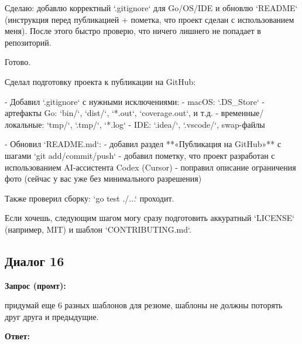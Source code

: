 \documentclass[a4paper, 14pt]{extarticle} %
\begin{document}
\begin{AnswerBlock}

Сделаю: добавлю корректный `.gitignore` для Go/OS/IDE и обновлю `README` (инструкция перед публикацией + пометка, что проект сделан с использованием меня). После этого быстро проверю, что ничего лишнего не попадает в репозиторий.

Готово.

Сделал подготовку проекта к публикации на GitHub:

- Добавил `.gitignore` с нужными исключениями:
  - macOS: `.DS_Store`
  - артефакты Go: `bin/`, `dist/`, `*.out`, `coverage.out`, и т.д.
  - временные/локальные: `tmp/`, `.tmp/`, `*.log`
  - IDE: `.idea/`, `.vscode/`, swap-файлы

- Обновил `README.md`:
  - добавил раздел **«Публикация на GitHub»** с шагами `git add/commit/push`
  - добавил пометку, что проект разработан с использованием AI‑ассистента Codex (Cursor)
  - поправил описание ограничения фото (сейчас у вас уже без минимального разрешения)

Также проверил сборку: `go test ./...` проходит.

Если хочешь, следующим шагом могу сразу подготовить аккуратный `LICENSE` (например, MIT) и шаблон `CONTRIBUTING.md`.

\end{AnswerBlock}

\subsection*{Диалог 16}

\textbf{Запрос (промт):}

\begin{PromptBlock}

придумай еще 6 разных шаблонов для резюме, шаблоны не должны поторять друг друга и предыдущие.

\end{PromptBlock}

\textbf{Ответ:}
\end{document}
